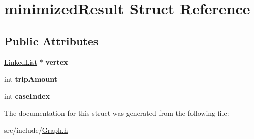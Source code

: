 \hypertarget{structminimizedResult}{}\section{minimized\+Result Struct Reference}
\label{structminimizedResult}
\subsection*{Public Attributes}
\begin{DoxyCompactItemize}
\item 
\mbox{\label{structminimizedResult_a7ee8c50473cda7a6a6ff4045965a7598}} 
\hyperlink{classLinkedList}{Linked\+List} $\ast$ {\bfseries vertex}
\item 
\mbox{\label{structminimizedResult_a06d0c1dbf1462d7d409d64169e90eca1}} 
int {\bfseries trip\+Amount}
\item 
\mbox{\label{structminimizedResult_a59e5528420a0599acabb362f777199e0}} 
int {\bfseries case\+Index}
\end{DoxyCompactItemize}


The documentation for this struct was generated from the following file\+:\begin{DoxyCompactItemize}
\item 
src/include/\hyperlink{Graph_8h}{Graph.\+h}\end{DoxyCompactItemize}
